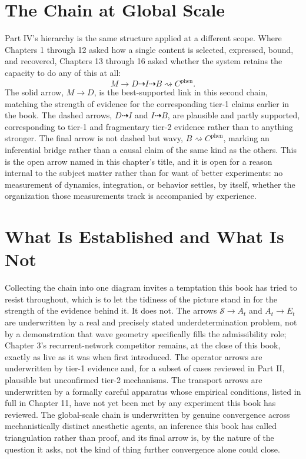 \documentclass[11pt]{book}
\begin{document}
\section*{The Chain at Global Scale}

Part IV's hierarchy is the same structure applied at a different scope. Where Chapters 1 through 12 asked how a single content is selected, expressed, bound, and recovered, Chapters 13 through 16 asked whether the system retains the capacity to do any of this at all:
\[
M
\longrightarrow
D
\dashrightarrow
I
\dashrightarrow
B
\rightsquigarrow
C^{\mathrm{phen}}.
\]
The solid arrow, $M\to D$, is the best-supported link in this second chain, matching the strength of evidence for the corresponding tier-1 claims earlier in the book. The dashed arrows, $D\dashrightarrow I$ and $I\dashrightarrow B$, are plausible and partly supported, corresponding to tier-1 and fragmentary tier-2 evidence rather than to anything stronger. The final arrow is not dashed but wavy, $B\rightsquigarrow C^{\mathrm{phen}}$, marking an inferential bridge rather than a causal claim of the same kind as the others. This is the open arrow named in this chapter's title, and it is open for a reason internal to the subject matter rather than for want of better experiments: no measurement of dynamics, integration, or behavior settles, by itself, whether the organization those measurements track is accompanied by experience.

\section*{What Is Established and What Is Not}

Collecting the chain into one diagram invites a temptation this book has tried to resist throughout, which is to let the tidiness of the picture stand in for the strength of the evidence behind it. It does not. The arrows $\mathcal S\to A_t$ and $A_t\to E_t$ are underwritten by a real and precisely stated underdetermination problem, not by a demonstration that wave geometry specifically fills the admissibility role; Chapter 3's recurrent-network competitor remains, at the close of this book, exactly as live as it was when first introduced. The operator arrows are underwritten by tier-1 evidence and, for a subset of cases reviewed in Part II, plausible but unconfirmed tier-2 mechanisms. The transport arrows are underwritten by a formally careful apparatus whose empirical conditions, listed in full in Chapter 11, have not yet been met by any experiment this book has reviewed. The global-scale chain is underwritten by genuine convergence across mechanistically distinct anesthetic agents, an inference this book has called triangulation rather than proof, and its final arrow is, by the nature of the question it asks, not the kind of thing further convergence alone could close.
\end{document}
